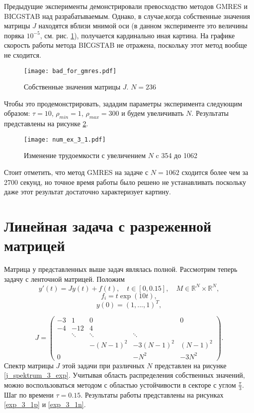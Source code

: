 \documentclass[a4paper, 14pt]{extreport} %
\begin{document}
Предыдущие эксперименты демонстрировали превосходство методов GMRES
и BIСGSTAB над разрабатываемым. Однако, в случае,когда собственные
значения матрицы $J$ находятся вблизи мнимой оси (в данном
эксперименте это величины поряка $10^{-5}$, см. рис. \ref{bad_for_gmres}),
получается кардинально иная картина. На графике скорость работы
метода BIСGSTAB не отражена, поскольку этот метод вообще не
сходится.

\begin{figure}[H]
\begin{center}
\texttt{[image: bad\_for\_gmres.pdf]}
\caption{\small Собственные значения матрицы $J$. $N = 236$}
\label{bad_for_gmres}
\end{center}
\end{figure}

Чтобы это продемонстрировать, зададим параметры эксперимента
следующим образом: $\tau = 10$, $\rho_{min} = 1$, $\rho_{max} = 300$
и будем увеличивать $N$. Результаты представлены на рисунке
\ref{num_ex_3_1}.

\begin{figure}[H]
\texttt{[image: num\_ex\_3\_1.pdf]}
\caption{\small Изменение трудоемкости с увеличением $N$ c 354 до 1062}
\label{num_ex_3_1}
\end{figure}

Стоит отметить, что метод GMRES на задаче с $N=1062$ сходится более чем за 2700 секунд, но точное время работы было решено не устанавливать поскольку даже этот результат достаточно характеризует картину.

\section{Линейная задача с разреженной матрицей}

Матрица у представленных выше задач являлась полной. Рассмотрим теперь задачу с ленточной матрицей. Положим
$$ y'(t)=J y(t) + f(t), \quad t\in[0,0.15], \quad M\in \mathbb R^N\times \mathbb R^N,$$
$$f_i = t \exp (10 t),$$
$$y(0) = (1,...,1)^T,$$

$$J =
\left(
\begin{array}{ccccc}
-3&1&0& &0\\
-4&-12&4& &\\
&\ddots&\ddots&\ddots\\
& & -(N-1)^2&-3(N-1)^2&(N-1)^2\\
0& & &-N^2&-3N^2
\end{array}\right).$$
Спектр матрицы $J$ этой задачи при различных $N$ представлен на рисунке \ref{j_spektrum_3_exp}. Учитывая область распределения собственных значений, можно воспользоваться методом с областью устойчивости в секторе с углом $\frac{\pi}{3}$. Шаг по времени  $\tau = 0.15$. Результаты работы представлены на рисунках  \ref{exp_3_1p} и \ref{exp_3_1n}.
\end{document}

